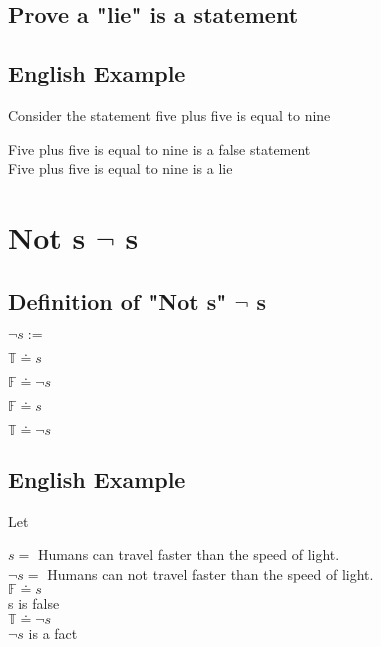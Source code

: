 \documentclass[11pt]{article}
\begin{document}
\subsection{Prove a "lie" is a statement}




\subsection{English Example}
Consider the statement five plus five is equal to nine
\begin{center}
Five plus five is equal to nine is a false statement\\ \vspace{2mm}
Five plus five is equal to nine is a lie
\end{center}






\section{Not s $\lnot$ s}
\subsection{Definition of "Not s" $\lnot$ s}
\vspace{2mm}
\begin{center}
$
\lnot s :=
$
\end{center}
$\mathbb{T} \doteq s$
\begin{center}
$
\mathbb{F} \doteq \lnot s
$
\end{center}
\vspace{2mm}
$\mathbb{F} \doteq s$
\begin{center}
$
\mathbb{T} \doteq \lnot s
$
\end{center}







\subsection{English Example}
Let
\begin{center}
$s=$ Humans can travel faster than the speed of light.\\ \vspace{2mm}
$\lnot s=$ Humans can not travel faster than the speed of light.\\ \vspace{2mm}
$\mathbb{F} \doteq s$\\
s is false\\ \vspace{2mm}
$\mathbb{T} \doteq \lnot s$\\
$\lnot s$ is a fact
\end{center}
\end{document}
